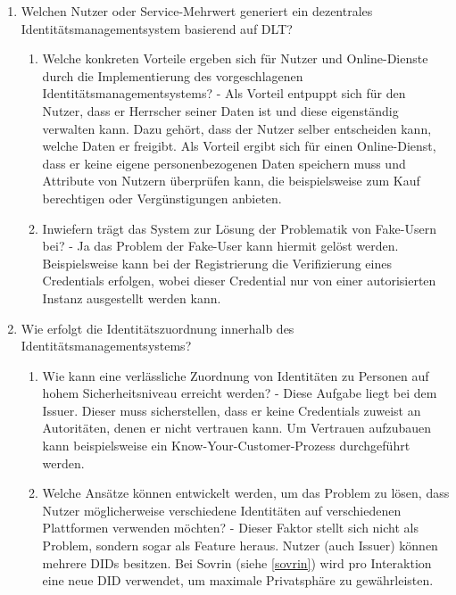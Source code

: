 \begin{enumerate}
\begin{enumerate}
	\end{enumerate}
	
	\item Welchen Nutzer oder Service-Mehrwert generiert ein dezentrales Identitätsmanagementsystem basierend auf DLT?
	\begin{enumerate}
		
		\item Welche konkreten Vorteile ergeben sich für Nutzer und Online-Dienste durch die Implementierung des vorgeschlagenen Identitätsmanagementsystems? - Als Vorteil entpuppt sich für den Nutzer, dass er Herrscher seiner Daten ist und diese eigenständig verwalten kann. Dazu gehört, dass der Nutzer selber entscheiden kann, welche Daten er freigibt. Als Vorteil ergibt sich für einen Online-Dienst, dass er keine eigene personenbezogenen Daten speichern muss und Attribute von Nutzern überprüfen kann, die beispielsweise zum Kauf berechtigen oder Vergünstigungen anbieten.
		
		\item Inwiefern trägt das System zur Lösung der Problematik von Fake-Usern bei? - Ja das Problem der Fake-User kann hiermit gelöst werden. Beispielsweise kann bei der Registrierung die Verifizierung eines Credentials erfolgen, wobei dieser Credential nur von einer autorisierten Instanz ausgestellt werden kann.
	\end{enumerate}
	
	\item Wie erfolgt die Identitätszuordnung innerhalb des Identitätsmanagementsystems?
	
	\begin{enumerate}
		\item Wie kann eine verlässliche Zuordnung von Identitäten zu Personen auf hohem Sicherheitsniveau erreicht werden? - Diese Aufgabe liegt bei dem Issuer. Dieser muss sicherstellen, dass er keine Credentials zuweist an Autoritäten, denen er nicht vertrauen kann. Um Vertrauen aufzubauen kann beispielsweise  ein Know-Your-Customer-Prozess durchgeführt werden.
		
		\item Welche Ansätze können entwickelt werden, um das Problem zu lösen, dass Nutzer möglicherweise verschiedene Identitäten auf verschiedenen Plattformen verwenden möchten? - Dieser Faktor stellt sich nicht als Problem, sondern sogar als Feature heraus. Nutzer (auch Issuer) können mehrere DIDs besitzen. Bei Sovrin (siehe \ref{sovrin}) wird pro Interaktion eine neue DID verwendet, um maximale Privatsphäre zu gewährleisten.
		

\end{enumerate}
\end{enumerate}
